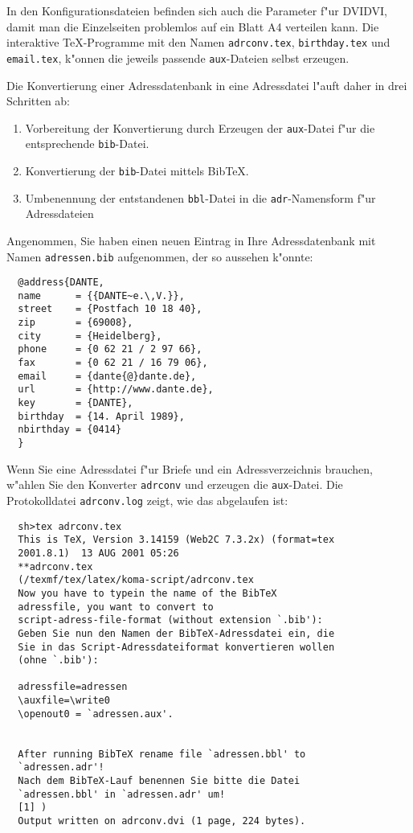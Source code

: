 \documentclass{article}
\newcommand*{\File}[1]{\texttt{#1}}
\begin{document}
In den Konfigurationsdateien befinden sich auch die Parameter f"ur 
DVIDVI, damit man die Einzelseiten problemlos auf ein Blatt A4 
verteilen kann. Die interaktive \TeX-Programme mit den
Namen \File{adrconv.tex}, \File{birthday.tex} und \File{email.tex},
k"onnen die jeweils passende \File{aux}-Dateien selbst erzeugen.

Die Konvertierung einer Adressdatenbank in eine Adressdatei l"auft
daher in drei Schritten ab:

\begin{enumerate}
        \item Vorbereitung der Konvertierung durch Erzeugen der 
        \File{aux}-Datei f"ur die entsprechende \File{bib}-Datei.
        
        \item Konvertierung der \File{bib}-Datei mittels Bib\TeX.
        
        \item Umbenennung der entstandenen \File{bbl}-Datei in die 
        \File{adr}-Namensform f"ur Adressdateien
\end{enumerate}


Angenommen, Sie haben einen neuen Eintrag in Ihre 
Adressdatenbank mit Namen \File{adressen.bib} aufgenommen,
der so aussehen k"onnte:

\begin{small}        
\begin{verbatim}
  @address{DANTE,
  name      = {{DANTE~e.\,V.}},
  street    = {Postfach 10 18 40},
  zip       = {69008},
  city      = {Heidelberg},
  phone     = {0 62 21 / 2 97 66},
  fax       = {0 62 21 / 16 79 06},
  email     = {dante{@}dante.de},
  url       = {http://www.dante.de},
  key       = {DANTE},
  birthday  = {14. April 1989},
  nbirthday = {0414}
  }
\end{verbatim}
\end{small}

Wenn Sie eine Adressdatei f"ur Briefe und ein 
Adressverzeichnis
brauchen, w"ahlen Sie den Konverter \File{adrconv} und erzeugen
die \File{aux}-Datei. Die Protokolldatei \File{adrconv.log}
zeigt, wie das abgelaufen ist:

\begin{small}        
\begin{verbatim}
  sh>tex adrconv.tex             
  This is TeX, Version 3.14159 (Web2C 7.3.2x) (format=tex 
  2001.8.1)  13 AUG 2001 05:26
  **adrconv.tex
  (/texmf/tex/latex/koma-script/adrconv.tex
  Now you have to typein the name of the BibTeX 
  adressfile, you want to convert to 
  script-adress-file-format (without extension `.bib'):
  Geben Sie nun den Namen der BibTeX-Adressdatei ein, die 
  Sie in das Script-Adressdateiformat konvertieren wollen 
  (ohne `.bib'):

  adressfile=adressen
  \auxfile=\write0
  \openout0 = `adressen.aux'.


  After running BibTeX rename file `adressen.bbl' to 
  `adressen.adr'!
  Nach dem BibTeX-Lauf benennen Sie bitte die Datei 
  `adressen.bbl' in `adressen.adr' um!
  [1] )
  Output written on adrconv.dvi (1 page, 224 bytes).
\end{verbatim}
\end{small}
\end{document}
